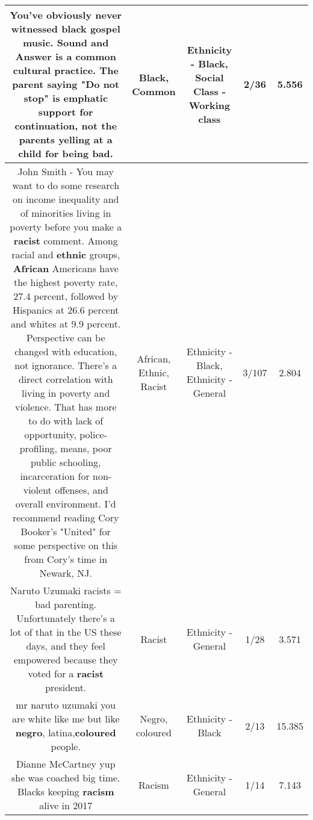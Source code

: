 \documentclass[11pt]{article}
\newlength\mylength
\begin{document}
\begin{center}
\begin{longtable}{|C{.65\mylength}|C{.30\mylength}|C{.12\mylength}|C{.12\mylength}|C{.12\mylength}|}
  \small You've obviously never witnessed \textbf{black} gospel music. Sound and Answer is a \textbf{common} cultural practice. The parent saying "Do not stop" is emphatic support for continuation, not the parents yelling at a child for being bad.\normalsize   & Black, Common & Ethnicity - Black, Social Class - Working class & 2/36 & 5.556 \\  \hline
  \small John Smith - You may want to do some research on income inequality and  of minorities living in poverty before you make a \textbf{racist} comment. Among racial and \textbf{ethnic} groups, \textbf{African} Americans have the highest poverty rate, 27.4 percent, followed by Hispanics at 26.6 percent and whites at 9.9 percent. Perspective can be changed with education, not ignorance. There's a direct correlation with living in poverty and violence. That has  more to do with lack of opportunity, police-profiling, means, poor public schooling, incarceration for non-violent offenses, and overall environment. I'd recommend reading Cory Booker's "United" for some perspective on this from Cory's time in Newark, NJ.\normalsize   & African, Ethnic, Racist & Ethnicity - Black, Ethnicity - General & 3/107 & 2.804 \\  \hline
  \small Naruto Uzumaki racists = bad parenting. Unfortunately there's a lot of that in the US these days, and they feel empowered because they voted for a \textbf{racist} president.\normalsize   & Racist & Ethnicity - General & 1/28 & 3.571 \\  \hline
  \small mr naruto uzumaki you are white like me but like \textbf{negro}, latina,\textbf{coloured} people.\normalsize   & Negro, coloured & Ethnicity - Black & 2/13 & 15.385 \\  \hline
  \small Dianne McCartney yup she was coached big time. Blacks keeping \textbf{racism} alive in 2017\normalsize   & Racism & Ethnicity - General & 1/14 & 7.143 \\  \hline

\end{longtable}
\end{center}
\end{document}
